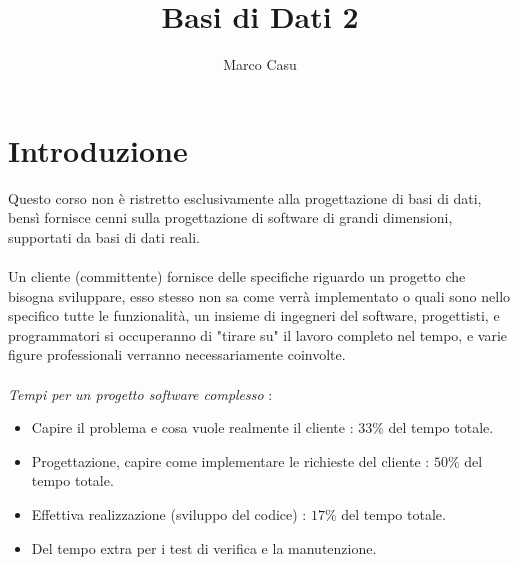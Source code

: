 \documentclass[12pt, letterpaper]{article}
\title{Basi di Dati 2}
\author{Marco Casu}
\date{\vspace{-5ex}}
\newcommand{\acc}{\\\hphantom{}\\}
\begin{document}
\maketitle
\begin{figure}[h]
\end{figure}
\newpage 
\tableofcontents
\newpage
\section{Introduzione}
Questo corso non è ristretto esclusivamente alla progettazione di basi di dati, bensì fornisce 
cenni sulla progettazione di software di grandi dimensioni, supportati da basi di dati reali.\acc 
Un cliente (committente) fornisce delle specifiche riguardo un progetto che bisogna sviluppare, 
esso stesso non sa come verrà implementato o quali sono nello specifico tutte le funzionalità, 
un insieme di ingegneri del software, progettisti, e programmatori si occuperanno di "tirare su" il 
lavoro completo nel tempo, e varie figure professionali verranno necessariamente coinvolte.\acc 
\textit{Tempi per un progetto software complesso} :\begin{itemize}
    \item Capire il problema e cosa vuole realmente il cliente : \(33\%\) del tempo totale.
    \item Progettazione, capire come implementare le richieste del cliente : \(50\%\) del tempo totale.
    \item Effettiva realizzazione (sviluppo del codice) : \(17\%\) del tempo totale.
    \item Del tempo extra per i test di verifica e la manutenzione.
\end{itemize}
\end{document}
